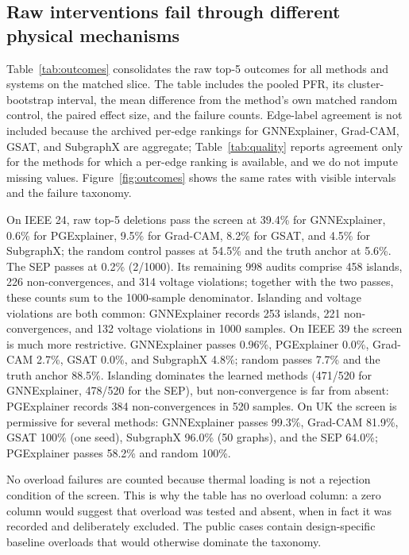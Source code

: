 \subsection{Raw interventions fail through different physical mechanisms}\label{raw_interventions_fail_through_different_physical_mechanisms}

Table~\ref{tab:outcomes} consolidates the raw top-5 outcomes for all methods and systems on the matched slice. The table includes the pooled PFR, its cluster-bootstrap interval, the mean difference from the method's own matched random control, the paired effect size, and the failure counts. Edge-label agreement is not included because the archived per-edge rankings for GNNExplainer, Grad-CAM, GSAT, and SubgraphX are aggregate; Table~\ref{tab:quality} reports agreement only for the methods for which a per-edge ranking is available, and we do not impute missing values. Figure~\ref{fig:outcomes} shows the same rates with visible intervals and the failure taxonomy.

On IEEE 24, raw top-5 deletions pass the screen at 39.4\% for GNNExplainer, 0.6\% for PGExplainer, 9.5\% for Grad-CAM, 8.2\% for GSAT, and 4.5\% for SubgraphX; the random control passes at 54.5\% and the truth anchor at 5.6\%. The SEP passes at 0.2\% (2/1000). Its remaining 998 audits comprise 458 islands, 226 non-convergences, and 314 voltage violations; together with the two passes, these counts sum to the 1000-sample denominator. Islanding and voltage violations are both common: GNNExplainer records 253 islands, 221 non-convergences, and 132 voltage violations in 1000 samples. On IEEE 39 the screen is much more restrictive. GNNExplainer passes 0.96\%, PGExplainer 0.0\%, Grad-CAM 2.7\%, GSAT 0.0\%, and SubgraphX 4.8\%; random passes 7.7\% and the truth anchor 88.5\%. Islanding dominates the learned methods (471/520 for GNNExplainer, 478/520 for the SEP), but non-convergence is far from absent: PGExplainer records 384 non-convergences in 520 samples. On UK the screen is permissive for several methods: GNNExplainer passes 99.3\%, Grad-CAM 81.9\%, GSAT 100\% (one seed), SubgraphX 96.0\% (50 graphs), and the SEP 64.0\%; PGExplainer passes 58.2\% and random 100\%.

No overload failures are counted because thermal loading is not a rejection condition of the screen. This is why the table has no overload column: a zero column would suggest that overload was tested and absent, when in fact it was recorded and deliberately excluded. The public cases contain design-specific baseline overloads that would otherwise dominate the taxonomy.

